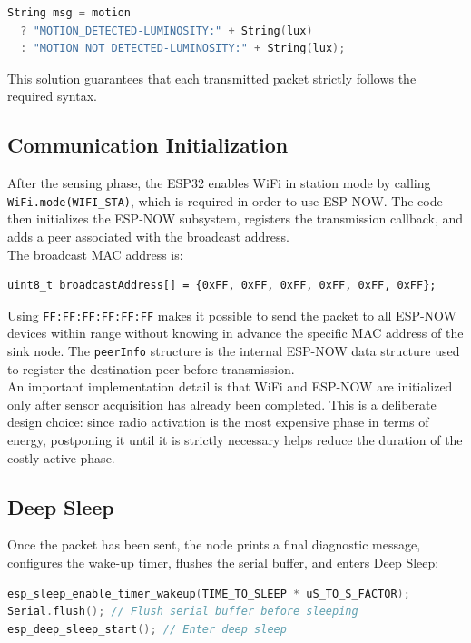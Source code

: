 \documentclass[a4paper,11pt]{article}
\begin{document}
\begin{lstlisting}[language=C++]
String msg = motion
  ? "MOTION_DETECTED-LUMINOSITY:" + String(lux)
  : "MOTION_NOT_DETECTED-LUMINOSITY:" + String(lux);
\end{lstlisting}

This solution guarantees that each transmitted packet strictly follows the required
syntax.

\subsection{Communication Initialization}

After the sensing phase, the ESP32 enables WiFi in station mode by calling
\texttt{WiFi.mode(WIFI\_STA)}, which is required in order to use ESP-NOW. The code
then initializes the ESP-NOW subsystem, registers the transmission callback, and adds
a peer associated with the broadcast address.\\

The broadcast MAC address is:

\begin{lstlisting}
uint8_t broadcastAddress[] = {0xFF, 0xFF, 0xFF, 0xFF, 0xFF, 0xFF};
\end{lstlisting}

Using \texttt{FF:FF:FF:FF:FF:FF} makes it possible to send the packet to all ESP-NOW
devices within range without knowing in advance the specific MAC address of the sink
node. The \texttt{peerInfo} structure is the internal ESP-NOW data structure used to
register the destination peer before transmission.\\

An important implementation detail is that WiFi and ESP-NOW are initialized only
after sensor acquisition has already been completed. This is a deliberate design
choice: since radio activation is the most expensive phase in terms of energy,
postponing it until it is strictly necessary helps reduce the duration of the costly
active phase.

\subsection{Deep Sleep}

Once the packet has been sent, the node prints a final diagnostic message, configures
the wake-up timer, flushes the serial buffer, and enters Deep Sleep:\\

\begin{lstlisting}[language=C++]
esp_sleep_enable_timer_wakeup(TIME_TO_SLEEP * uS_TO_S_FACTOR);
Serial.flush(); // Flush serial buffer before sleeping
esp_deep_sleep_start(); // Enter deep sleep
\end{lstlisting}
\end{document}
